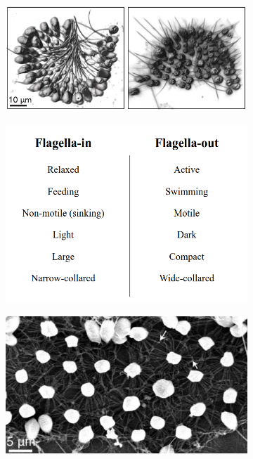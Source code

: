 \begin{figure}[htbp]
	\centering
	\begin{subfigure}[b]{0.55\textwidth}
		\centering
		\includegraphics[width=\textwidth]{cflexa.png}
		\caption{}
		\label{subfig:cflexa}
	\end{subfigure}
	\begin{subfigure}[b]{0.43\textwidth}
		\centering
		\includegraphics[width=\textwidth]{table.png}
		\caption{}
		\label{subfig:table}
	\end{subfigure}
	\begin{subfigure}[b]{0.57\textwidth}
		\centering
		\includegraphics[width=\textwidth]{contact1.png}

\end{subfigure}
\end{figure}
